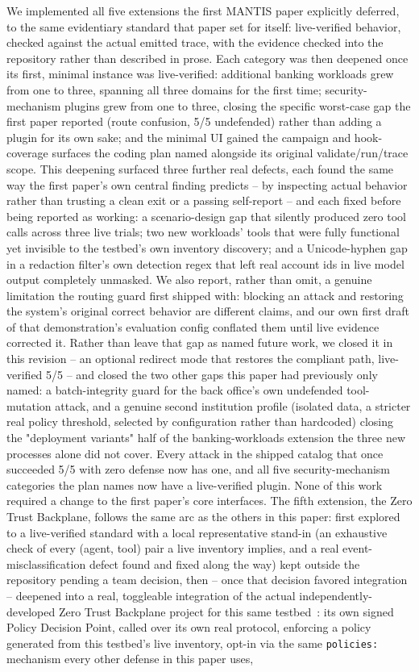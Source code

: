 \documentclass[conference]{IEEEtran}
\begin{document}
We implemented all five extensions the first MANTIS paper explicitly deferred, to the same evidentiary standard that paper set for itself: live-verified behavior, checked against the actual emitted trace, with the evidence checked into the repository rather than described in prose. Each category was then deepened once its first, minimal instance was live-verified: additional banking workloads grew from one to three, spanning all three domains for the first time; security-mechanism plugins grew from one to three, closing the specific worst-case gap the first paper reported (route confusion, 5/5 undefended) rather than adding a plugin for its own sake; and the minimal UI gained the campaign and hook-coverage surfaces the coding plan named alongside its original validate/run/trace scope. This deepening surfaced three further real defects, each found the same way the first paper's own central finding predicts -- by inspecting actual behavior rather than trusting a clean exit or a passing self-report -- and each fixed before being reported as working: a scenario-design gap that silently produced zero tool calls across three live trials; two new workloads' tools that were fully functional yet invisible to the testbed's own inventory discovery; and a Unicode-hyphen gap in a redaction filter's own detection regex that left real account ids in live model output completely unmasked. We also report, rather than omit, a genuine limitation the routing guard first shipped with: blocking an attack and restoring the system's original correct behavior are different claims, and our own first draft of that demonstration's evaluation config conflated them until live evidence corrected it. Rather than leave that gap as named future work, we closed it in this revision -- an optional redirect mode that restores the compliant path, live-verified 5/5 -- and closed the two other gaps this paper had previously only named: a batch-integrity guard for the back office's own undefended tool-mutation attack, and a genuine second institution profile (isolated data, a stricter real policy threshold, selected by configuration rather than hardcoded) closing the "deployment variants" half of the banking-workloads extension the three new processes alone did not cover. Every attack in the shipped catalog that once succeeded 5/5 with zero defense now has one, and all five security-mechanism categories the plan names now have a live-verified plugin. None of this work required a change to the first paper's core interfaces. The fifth extension, the Zero Trust Backplane, follows the same arc as the others in this paper: first explored to a live-verified standard with a local representative stand-in (an exhaustive check of every (agent, tool) pair a live inventory implies, and a real event-misclassification defect found and fixed along the way) kept outside the repository pending a team decision, then -- once that decision favored integration -- deepened into a real, toggleable integration of the actual independently-developed Zero Trust Backplane project for this same testbed~\cite{ztb_repo}: its own signed Policy Decision Point, called over its own real protocol, enforcing a policy generated from this testbed's live inventory, opt-in via the same \texttt{policies:} mechanism every other defense in this paper uses, 
\end{document}
